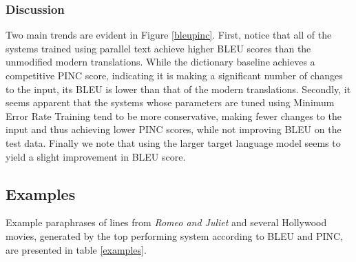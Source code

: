 \documentclass[10pt,a5paper,twoside]{article}
\begin{document}
\subsubsection{Discussion}
Two main trends are evident in Figure \ref{bleupinc}.  First, notice that all of the systems trained using parallel text achieve higher BLEU scores than the unmodified modern
translations.  While the dictionary baseline achieves a competitive PINC score, indicating it is making a significant number of changes to the 
input, its BLEU is lower than that of the modern translations.  Secondly, it seems apparent that the systems whose parameters are tuned using Minimum Error Rate Training
tend to be more conservative, making fewer changes to the input and thus achieving lower PINC scores, while not improving BLEU on the test data.  Finally
we note that using the larger target language model seems to yield a slight improvement in BLEU score.

\subsection{Examples}
Example paraphrases of lines from {\em Romeo and Juliet} and several Hollywood movies, generated by the top performing system according to BLEU and PINC, are presented in table \ref{examples}.
\end{document}
